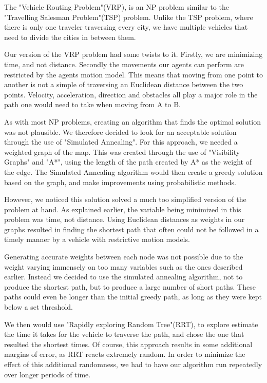 \documentclass[a4paper,12pt]{article}
\begin{document}
The "Vehicle Routing Problem"(VRP), is an NP problem similar to the "Travelling Salesman Problem"(TSP) problem. Unlike the TSP problem, where there is only one traveler traversing every city, we have multiple vehicles that need to divide the cities in between them. 

Our version of the VRP problem had some twists to it.
Firstly, we are minimizing time, and not distance. Secondly the movements our agents can perform are restricted by the agents motion model. 
This means that moving from one point to another is not a simple of traversing an Euclidean distance between the two points. Velocity, acceleration, direction and obstacles all play a major role in the path one would need to take when moving from A to B.

As with most NP problems, creating an algorithm that finds the optimal solution was not plausible. We therefore decided to look for an acceptable solution through the use of "Simulated Annealing".
For this approach, we needed a weighted graph of the map. This was created through the use of "Visibility Graphs" and "A*", using the length of the path created by A* as the weight of the edge. The Simulated Annealing algorithm would then create a greedy solution based on the graph, and make improvements using probabilistic methods.

However, we noticed this solution solved a much too simplified version of the problem at hand.  As explained earlier, the variable being minimized in this problem was time, not distance. Using Euclidean distances as weights in our graphs resulted in finding the shortest path that often could not be followed in a timely manner by a vehicle with restrictive motion models.

Generating accurate weights between each node was not possible due to the weight varying immensely on too many variables such as the ones described earlier. Instead we decided to use the simulated annealing algorithm, not to produce the shortest path, but to produce a large number of short paths. These paths could even be longer than the initial greedy path, as long as they were kept below a set threshold. 

We then would use "Rapidly exploring Random Tree"(RRT), to explore estimate the time it takes for the vehicle to traverse the path, and chose the one that resulted the shortest times.
Of course, this approach results in some additional margins of error, as RRT reacts extremely random. In order to minimize the effect of this additional randomness, we had to have our algorithm run repeatedly over longer periods of time.
\end{document}
